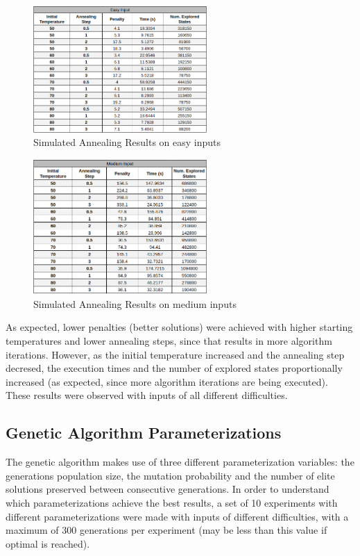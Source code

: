 \documentclass[conference]{IEEEtran}
\begin{document}
\begin{figure}[H]
    \centerline{\includegraphics[width=250px]{annealing_easy.png}}
    \caption{Simulated Annealing Results on easy inputs}
\end{figure}

\begin{figure}[H]
    \centerline{\includegraphics[width=250px]{annealing_medium.png}}
    \caption{Simulated Annealing Results on medium inputs}
\end{figure}

As expected, lower penalties (better solutions) were achieved with higher starting temperatures and lower annealing steps, since that results in more algorithm iterations. However, as the initial temperature increased and the annealing step decresed, the execution times and the number of explored states proportionally increased (as expected, since more algorithm iterations are being executed). These results were observed with inputs of all different difficulties.

\subsection{Genetic Algorithm Parameterizations}

The genetic algorithm makes use of three different parameterization variables: the generations population size, the mutation probability and the number of elite solutions preserved between consecutive generations. In order to understand which parameterizations achieve the best results, a set of 10 experiments with different parameterizations were made with inputs of different difficulties, with a maximum of 300 generations per experiment (may be less than this value if optimal is reached).
\end{document}
